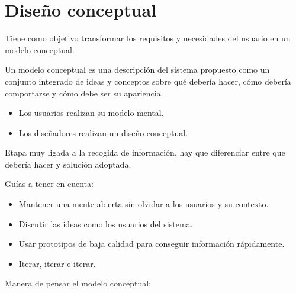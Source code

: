 \documentclass[12pt, twoside, openright]{report} %
\begin{document}
          
        

\section{Diseño conceptual}

    Tiene como objetivo transformar los requisitos y necesidades del
    usuario en un modelo conceptual.

    Un modelo conceptual es una descripción del sistema propuesto como
    un conjunto integrado de ideas y conceptos sobre qué debería hacer,
    cómo debería comportarse y cómo debe ser su apariencia.
\vspace{-0.5cm}
    \begin{itemize}
    
    \item
      Los usuarios realizan su modelo mental.
    \item
      Los diseñadores realizan un diseño conceptual.
    \end{itemize}

    Etapa muy ligada a la recogida de información, hay que diferenciar
    entre que debería hacer y solución adoptada.

    Guías a tener en cuenta:
    \vspace{-0.5cm}

    \begin{itemize}
    
    \item
      Mantener una mente abierta sin olvidar a los usuarios y su
      contexto.
    \item
      Discutir las ideas como los usuarios del sistema.
    \item
      Usar prototipos de baja calidad para conseguir información
      rápidamente.
    \item
      Iterar, iterar e iterar.
    \end{itemize}

    Manera de pensar el modelo conceptual:
\end{document}
